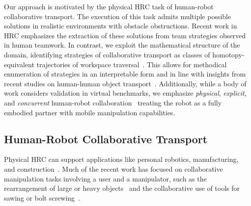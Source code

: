Our approach is motivated by the physical HRC task of human-robot collaborative transport. The execution of this task admits multiple possible solutions in realistic environments with obstacle obstructions.
Recent work in HRC emphasizes the extraction of these solutions from team strategies observed in human teamwork. In contrast, we exploit the mathematical structure of the domain, identifying strategies of collaborative transport as classes of homotopy-equivalent trajectories of workspace traversal~\citep{knepper2012equivalence,vernaza2013winding,kretzschmar2016irl}. This allows for methodical enumeration of strategies in an interpretable form and in line with insights from recent studies on human-human object transport~\citep{freeman2023classification}. Additionally, while a body of work considers validation in virtual benchmarks, we emphasize \emph{physical}, \emph{explicit}, and \emph{concurrent} human-robot collaboration~\citep{selvaggio2021survey} treating the robot as a fully embodied partner with mobile manipulation capabilities.


\subsection{Human-Robot Collaborative Transport}

Physical HRC can support applications like personal robotics, manufacturing, and construction~\citep{losey2018review-shared,ogenyi2019physical,selvaggio2021survey}. Much of the recent work has focused on collaborative manipulation tasks involving a user and a manipulator, such as the rearrangement of large or heavy objects~\citep{gienger2018contactchanges,kim2018anticipatory,stouraitis2020bilevel,al2023resolving,kucukyilmaz2019online,agravante2014collaborative,Zheng2022SafeHC,Shao2024comanipulation} and the collaborative use of tools for sawing or bolt screwing~\citep{peternel2017comanipulation}.

